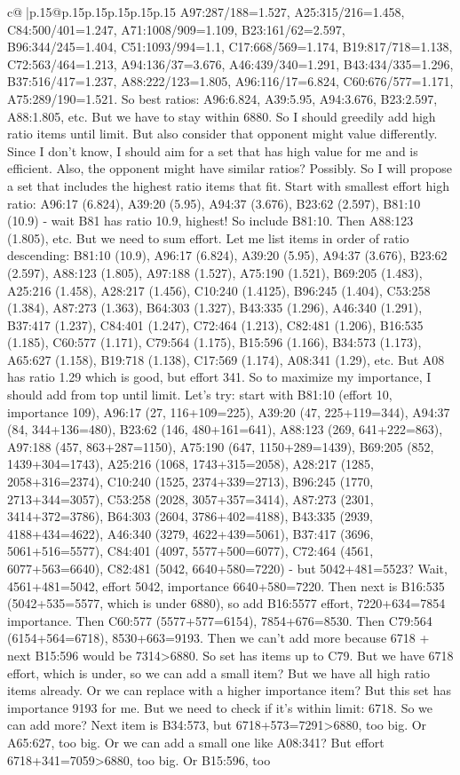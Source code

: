 \documentclass{article}
\begin{document}
{\begin{supertabular}{c@{$\;$}|p{.15\linewidth}@{}p{.15\linewidth}p{.15\linewidth}p{.15\linewidth}p{.15\linewidth}p{.15\linewidth}}
{{{A97:287/188=1.527, A25:315/216=1.458, C84:500/401=1.247, A71:1008/909=1.109, B23:161/62=2.597, B96:344/245=1.404, C51:1093/994=1.1, C17:668/569=1.174, B19:817/718=1.138, C72:563/464=1.213, A94:136/37=3.676, A46:439/340=1.291, B43:434/335=1.296, B37:516/417=1.237, A88:222/123=1.805, A96:116/17=6.824, C60:676/577=1.171, A75:289/190=1.521. So best ratios: A96:6.824, A39:5.95, A94:3.676, B23:2.597, A88:1.805, etc. But we have to stay within 6880. So I should greedily add high ratio items until limit. But also consider that opponent might value differently. Since I don't know, I should aim for a set that has high value for me and is efficient. Also, the opponent might have similar ratios? Possibly. So I will propose a set that includes the highest ratio items that fit. Start with smallest effort high ratio: A96:17 (6.824), A39:20 (5.95), A94:37 (3.676), B23:62 (2.597), B81:10 (10.9) {-} wait B81 has ratio 10.9, highest! So include B81:10. Then A88:123 (1.805), etc. But we need to sum effort. Let me list items in order of ratio descending: B81:10 (10.9), A96:17 (6.824), A39:20 (5.95), A94:37 (3.676), B23:62 (2.597), A88:123 (1.805), A97:188 (1.527), A75:190 (1.521), B69:205 (1.483), A25:216 (1.458), A28:217 (1.456), C10:240 (1.4125), B96:245 (1.404), C53:258 (1.384), A87:273 (1.363), B64:303 (1.327), B43:335 (1.296), A46:340 (1.291), B37:417 (1.237), C84:401 (1.247), C72:464 (1.213), C82:481 (1.206), B16:535 (1.185), C60:577 (1.171), C79:564 (1.175), B15:596 (1.166), B34:573 (1.173), A65:627 (1.158), B19:718 (1.138), C17:569 (1.174), A08:341 (1.29), etc. But A08 has ratio 1.29 which is good, but effort 341. So to maximize my importance, I should add from top until limit. Let's try: start with B81:10 (effort 10, importance 109), A96:17 (27, 116+109=225), A39:20 (47, 225+119=344), A94:37 (84, 344+136=480), B23:62 (146, 480+161=641), A88:123 (269, 641+222=863), A97:188 (457, 863+287=1150), A75:190 (647, 1150+289=1439), B69:205 (852, 1439+304=1743), A25:216 (1068, 1743+315=2058), A28:217 (1285, 2058+316=2374), C10:240 (1525, 2374+339=2713), B96:245 (1770, 2713+344=3057), C53:258 (2028, 3057+357=3414), A87:273 (2301, 3414+372=3786), B64:303 (2604, 3786+402=4188), B43:335 (2939, 4188+434=4622), A46:340 (3279, 4622+439=5061), B37:417 (3696, 5061+516=5577), C84:401 (4097, 5577+500=6077), C72:464 (4561, 6077+563=6640), C82:481 (5042, 6640+580=7220) {-} but 5042+481=5523? Wait, 4561+481=5042, effort 5042, importance 6640+580=7220. Then next is B16:535 (5042+535=5577, which is under 6880), so add B16:5577 effort, 7220+634=7854 importance. Then C60:577 (5577+577=6154), 7854+676=8530. Then C79:564 (6154+564=6718), 8530+663=9193. Then we can't add more because 6718 + next B15:596 would be 7314>6880. So set has items up to C79. But we have 6718 effort, which is under, so we can add a small item? But we have all high ratio items already. Or we can replace with a higher importance item? But this set has importance 9193 for me. But we need to check if it's within limit: 6718. So we can add more? Next item is B34:573, but 6718+573=7291>6880, too big. Or A65:627, too big. Or we can add a small one like A08:341? But effort 6718+341=7059>6880, too big. Or B15:596, too }}}
\end{supertabular}}
\end{document}
